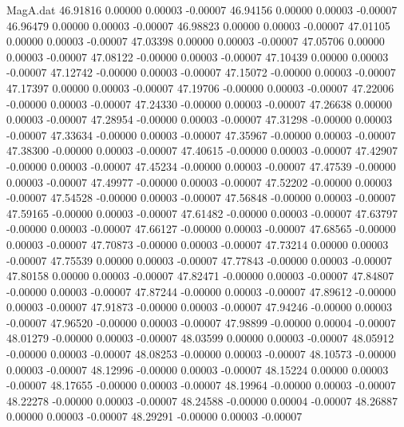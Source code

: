 \begin{filecontents}{MagA.dat}
  46.91816    0.00000    0.00003   -0.00007
  46.94156    0.00000    0.00003   -0.00007
  46.96479    0.00000    0.00003   -0.00007
  46.98823    0.00000    0.00003   -0.00007
  47.01105    0.00000    0.00003   -0.00007
  47.03398    0.00000    0.00003   -0.00007
  47.05706    0.00000    0.00003   -0.00007
  47.08122   -0.00000    0.00003   -0.00007
  47.10439    0.00000    0.00003   -0.00007
  47.12742   -0.00000    0.00003   -0.00007
  47.15072   -0.00000    0.00003   -0.00007
  47.17397    0.00000    0.00003   -0.00007
  47.19706   -0.00000    0.00003   -0.00007
  47.22006   -0.00000    0.00003   -0.00007
  47.24330   -0.00000    0.00003   -0.00007
  47.26638    0.00000    0.00003   -0.00007
  47.28954   -0.00000    0.00003   -0.00007
  47.31298   -0.00000    0.00003   -0.00007
  47.33634   -0.00000    0.00003   -0.00007
  47.35967   -0.00000    0.00003   -0.00007
  47.38300   -0.00000    0.00003   -0.00007
  47.40615   -0.00000    0.00003   -0.00007
  47.42907   -0.00000    0.00003   -0.00007
  47.45234   -0.00000    0.00003   -0.00007
  47.47539   -0.00000    0.00003   -0.00007
  47.49977   -0.00000    0.00003   -0.00007
  47.52202   -0.00000    0.00003   -0.00007
  47.54528   -0.00000    0.00003   -0.00007
  47.56848   -0.00000    0.00003   -0.00007
  47.59165   -0.00000    0.00003   -0.00007
  47.61482   -0.00000    0.00003   -0.00007
  47.63797   -0.00000    0.00003   -0.00007
  47.66127   -0.00000    0.00003   -0.00007
  47.68565   -0.00000    0.00003   -0.00007
  47.70873   -0.00000    0.00003   -0.00007
  47.73214    0.00000    0.00003   -0.00007
  47.75539    0.00000    0.00003   -0.00007
  47.77843   -0.00000    0.00003   -0.00007
  47.80158    0.00000    0.00003   -0.00007
  47.82471   -0.00000    0.00003   -0.00007
  47.84807   -0.00000    0.00003   -0.00007
  47.87244   -0.00000    0.00003   -0.00007
  47.89612   -0.00000    0.00003   -0.00007
  47.91873   -0.00000    0.00003   -0.00007
  47.94246   -0.00000    0.00003   -0.00007
  47.96520   -0.00000    0.00003   -0.00007
  47.98899   -0.00000    0.00004   -0.00007
  48.01279   -0.00000    0.00003   -0.00007
  48.03599    0.00000    0.00003   -0.00007
  48.05912   -0.00000    0.00003   -0.00007
  48.08253   -0.00000    0.00003   -0.00007
  48.10573   -0.00000    0.00003   -0.00007
  48.12996   -0.00000    0.00003   -0.00007
  48.15224    0.00000    0.00003   -0.00007
  48.17655   -0.00000    0.00003   -0.00007
  48.19964   -0.00000    0.00003   -0.00007
  48.22278   -0.00000    0.00003   -0.00007
  48.24588   -0.00000    0.00004   -0.00007
  48.26887    0.00000    0.00003   -0.00007
  48.29291   -0.00000    0.00003   -0.00007

\end{filecontents}
